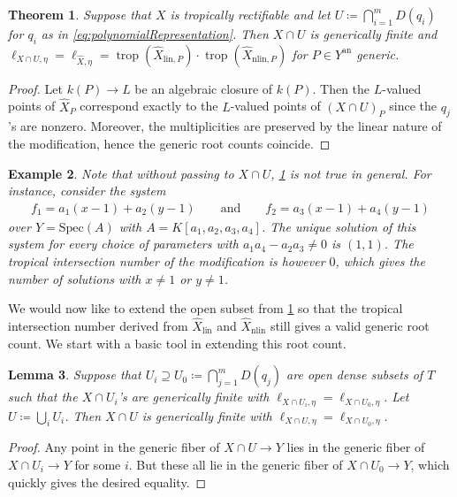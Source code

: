 \documentclass[12pt,reqno,a4paper]{amsart}
\theoremstyle{theoremstyle}
\newtheorem{theorem}{Theorem}[section]
\newtheorem{lemma}[theorem]{Lemma}
\theoremstyle{examplestyle}
\newtheorem{example}[theorem]{Example}
\theoremstyle{algorithmstyle}
\DeclareMathOperator{\trop}{trop}
\begin{document}
\begin{theorem}\label{thm:GRCModification}
  Suppose that $X$ is tropically rectifiable and let $U\coloneqq \bigcap_{i=1}^{m} D(q_{i})$ for $q_{i}$ as in \cref{eq:polynomialRepresentation}. Then $X\cap U$ is generically finite and  $\ell_{X\cap U,\eta}=\ell_{\widehat{X},\eta}=\trop(\widehat{X}_{\mathrm{lin},P})\cdot \trop(\widehat{X}_{\mathrm{nlin},P})$ for $P\in Y^{\mathrm{an}}$ generic.
\end{theorem}
\begin{proof}
  Let $k(P)\to L$ be an algebraic closure of $k(P)$. Then the
  $L$-valued points of $\widehat{X}_P$ correspond exactly to the $L$-valued points of $(X\cap U)_P$ since the $q_{j}$'s are nonzero. Moreover, the multiplicities are preserved by the linear nature of the modification, hence the generic root counts coincide.
\end{proof}



\begin{example}\label{exa:LocalizeGRC}
  Note that without passing to $X\cap U$, \cref{thm:GRCModification} is not true in general. For instance, consider the system
  \begin{align*}
    f_{1}=a_{1}(x-1)+a_{2}(y-1) \qquad \text{and} \qquad
    f_{2}=a_{3}(x-1)+a_{4}(y-1)
  \end{align*}
  over $Y=\mathrm{Spec}(A)$ with $A=K[a_{1},a_{2},a_{3},a_{4}]$. The unique solution of this system for every choice of parameters with $a_{1}a_{4}-a_{2}a_{3}\neq{0}$ is $(1,1)$. The tropical intersection number of the modification is however $0$, which gives the number of solutions with $x\neq{1}$ or $y\neq{1}$.
\end{example}

We would now like to extend the open subset from \cref{thm:GRCModification} so that the tropical intersection number derived from $\widehat{X}_{\mathrm{lin}}$ and $\widehat{X}_{\mathrm{nlin}}$ still gives a valid generic root count. We start with a basic tool in extending this root count.

\begin{lemma}\label{lem:CombineOpenSetsGRC}
  Suppose that $U_{i}\supseteq{U_{0}}\coloneqq {\bigcap_{j=1}^{m}D(q_{j})}$ are open dense subsets of $T$ such that the $X\cap U_i$'s are generically finite with  $\ell_{X\cap U_i,\eta}=\ell_{X\cap U_0,\eta}$. Let $U\coloneqq\bigcup_{i} U_{i}$. Then $X\cap U$ is generically finite with $\ell_{X\cap U,\eta}=\ell_{X\cap U_0,\eta}$.
\end{lemma}
\begin{proof}
  Any point in the generic fiber of $X\cap U\to{Y}$ lies in the generic fiber of $X\cap U_i\to Y$ for some $i$. But these all lie in the generic fiber of $X\cap U_0\to Y$, which quickly gives the desired equality.
\end{proof}
\end{document}
